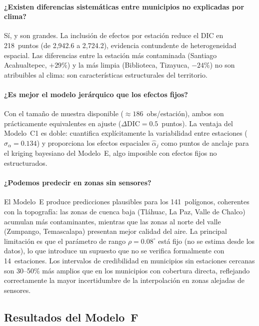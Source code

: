 \documentclass[12pt]{article}
\begin{document}
\paragraph{¿Existen diferencias sistem\'aticas entre municipios no explicadas por clima?}
S\'i, y son grandes.
La inclusi\'on de efectos por estaci\'on reduce el DIC en 218~puntos
(de 2{,}942.6 a 2{,}724.2), evidencia contundente de heterogeneidad
espacial.
Las diferencias entre la estaci\'on m\'as contaminada (Santiago
Acahualtepec, $+29\%$) y la m\'as limpia (Biblioteca, Tizayuca, $-24\%$)
no son atribuibles al clima: son caracter\'isticas estructurales del
territorio.

\paragraph{¿Es mejor el modelo jer\'arquico que los efectos fijos?}
Con el tama\~no de muestra disponible ($\approx 186$~obs/estaci\'on),
ambos son pr\'acticamente equivalentes en ajuste
($\Delta\text{DIC} = 0.5$~puntos).
La ventaja del Modelo~C1 es doble: cuantifica expl\'icitamente la
variabilidad entre estaciones ($\hat\sigma_\alpha = 0.134$) y proporciona
los efectos espaciales $\hat\alpha_j$ como puntos de anclaje para el
kriging bayesiano del Modelo~E, algo imposible con efectos fijos
no estructurados.

\paragraph{¿Podemos predecir en zonas sin sensores?}
El Modelo~E produce predicciones plausibles para los 141~pol\'igonos,
coherentes con la topograf\'ia: las zonas de cuenca baja (Tl\'ahuac,
La Paz, Valle de Chalco) acumulan m\'as contaminantes, mientras que
las zonas al norte del valle (Zumpango, Temascalapa) presentan mejor
calidad del aire.
La principal limitaci\'on es que el par\'ametro de rango $\rho = 0.08^\circ$
est\'a fijo (no se estima desde los datos), lo que introduce un supuesto
que no se verifica formalmente con 14~estaciones.
Los intervalos de credibilidad en municipios sin estaciones cercanas son
30--50\% m\'as amplios que en los municipios con cobertura directa,
reflejando correctamente la mayor incertidumbre de la interpolaci\'on
en zonas alejadas de sensores.


\subsection{Resultados del Modelo~F}
\end{document}
